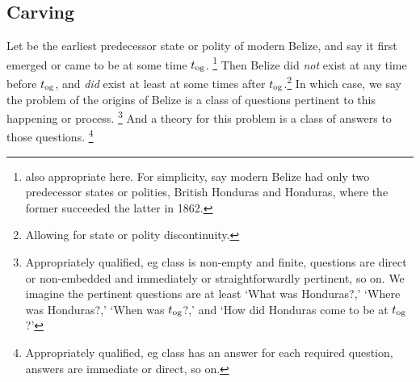 	\subsection{Carving}
	\label{ss:carving}
		Let  be the earliest predecessor state or polity of modern Belize, and say it first emerged or came to be at some time \(t_{\operatorname{og}}\).%
		\footnote{ also appropriate here. For simplicity, say modern Belize had only two predecessor states or polities, British Honduras and Honduras, where the former succeeded the latter in 1862.}
		Then Belize did \emph{not} exist at any time before \(t_{\operatorname{og}}\), and \emph{did} exist at least at some times after \(t_{\operatorname{og}}\).\footnote{Allowing for state or polity discontinuity.} In which case, we say the problem of the origins of Belize is a class of questions pertinent to this happening or process.%
		\footnote{Appropriately qualified, eg class is non-empty and finite, questions are direct or non-embedded and immediately or straightforwardly pertinent, so on. We imagine the pertinent questions are at least `What was Honduras?,' `Where was Honduras?,' `When was \(t_{\operatorname{og}}\)?,' and `How did Honduras come to be at \(t_{\operatorname{og}}\)?'}
		And a theory for this problem is a class of answers to those questions.%
		\footnote{Appropriately qualified, eg class has an answer for each required question, answers are immediate or direct, so on.}
